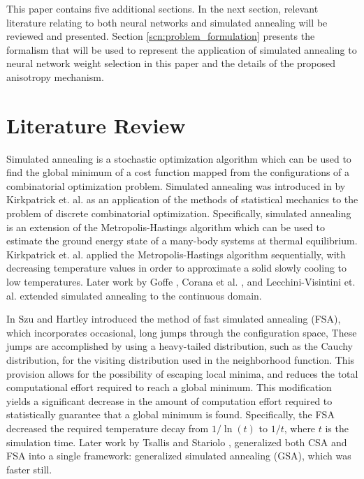 \documentclass[10pt,journal,cspaper,compsoc]{IEEEtran}
\begin{document}
This paper contains five additional sections. In the next section, relevant literature relating to both neural networks and simulated annealing will be reviewed and presented. Section \ref{scn:problem_formulation} presents the formalism that will be used to represent the application of simulated annealing to neural network weight selection in this paper and the details of the proposed anisotropy mechanism. 
  
\section{Literature Review}
\label{scn:lit_review}


Simulated annealing is a stochastic optimization algorithm which can be used to find the global minimum\cite{geman1984stochasticrelaxation} of a cost function mapped from the configurations of a combinatorial optimization problem. Simulated annealing was introduced in  \cite{kirkpatrick1983} by Kirkpatrick et. al. as an application of the methods of statistical mechanics to the problem of discrete combinatorial optimization. Specifically, simulated annealing is an extension of the Metropolis-Hastings \cite{metropolis1953} algorithm which can be used to estimate the ground energy state of a many-body systems at thermal equilibrium. Kirkpatrick et. al. applied the Metropolis-Hastings algorithm sequentially, with decreasing temperature values in order to approximate a solid slowly cooling to low temperatures. Later work by Goffe \cite{goffe1994globaloptimization}, Corana et al. \cite{corana1987minimizingmultimodal}, and Lecchini-Visintini et. al. \cite{lecchinivisintini2007sacontinuousgaruntees} extended simulated annealing to the continuous domain. 

In \cite{szu1987fastsimulatedannealing} Szu and Hartley introduced the method of fast simulated annealing (FSA), which incorporates occasional, long jumps through the configuration space, These jumps are accomplished by using a heavy-tailed distribution, such as the Cauchy distribution, for the visiting distribution used in the neighborhood function. This provision allows for the possibility of escaping local minima, and reduces the total computational effort required to reach a global minimum. This modification yields a significant decrease in the amount of computation effort required to statistically guarantee that a global minimum is found. Specifically, the FSA decreased the required temperature decay from $1/\ln(t)$ to $1/t$, where $t$ is the simulation time. Later work by Tsallis and Stariolo \cite{tsallis1996generalizedsimulatedannealing}, generalized both CSA and FSA into a single framework: generalized simulated annealing (GSA), which was faster still.
\end{document}
